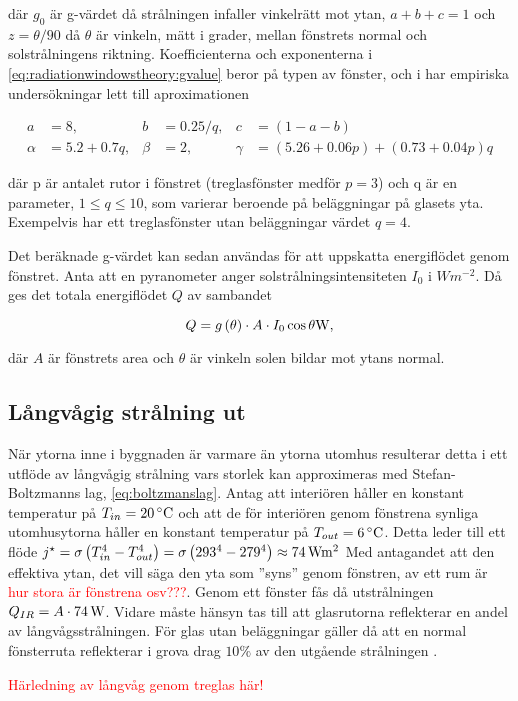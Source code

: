där $g_0$ är g-värdet då strålningen infaller vinkelrätt mot ytan, $a+b+c=1$ och $z=\theta/90$ då $\theta$ är vinkeln, mätt i grader, mellan fönstrets normal och solstrålningens riktning. Koefficienterna och exponenterna i \eqref{eq:radiationwindowstheory:gvalue} beror på typen av fönster, och i \cite{karlssonroos99} har empiriska undersökningar lett till aproximationen

\begin{align}\label{eq:gconstants}
a & = 8, & b & = 0.25/q, & c & = (1-a-b) \nonumber \\
\alpha & = 5.2 + 0.7q, & \beta & = 2, & \gamma & = (5.26+0.06p) + (0.73+0.04p)q
\end{align}

där p är antalet rutor i fönstret (treglasfönster medför $p = 3$) och q är en parameter, $1 \le q \le 10$, som varierar beroende på beläggningar på glasets yta. Exempelvis har ett treglasfönster utan beläggningar värdet $q=4$.

Det beräknade g-värdet kan sedan användas för att uppskatta energiflödet genom fönstret. Anta att en pyranometer anger solstrålningsintensiteten $I_0$ i $\unit{W m^{-2}}$. Då ges det totala energiflödet $Q$ av sambandet 

\begin{equation}\label{eq:totalsun}
Q = g \left( \theta \right)\cdot A \cdot I_0 \cos{\theta} \unit[]{W},
\end{equation}

där $A$ är fönstrets area och $\theta$ är vinkeln solen bildar mot ytans normal.

\subsection{Långvågig strålning ut}

När ytorna inne i byggnaden är varmare än ytorna utomhus resulterar detta i ett utflöde av långvågig strålning vars storlek kan approximeras med Stefan-Boltzmanns lag, \ref{eq:boltzmanslag}. Antag att interiören håller en konstant temperatur på $T_{in} = \unit[20]{^{\circ}C}$ och att de för interiören genom fönstrena synliga utomhusytorna håller en konstant temperatur på $T_{out} = \unit[6]{^{\circ}C}$. Detta leder till ett flöde $j^{\star} = \sigma \left( T_{in}^{4}-T_{out}^4\right) = \sigma \left( 293^4-279^4 \right) \approx \unit[74]{Wm^{2}}$ Med antagandet att den effektiva ytan, det vill säga den yta som ''syns'' genom fönstren, av ett rum är \textcolor{red}{hur stora är fönstrena osv???}. Genom ett fönster fås då utstrålningen $Q_{IR}=A\cdot\unit[74]{W}$. Vidare måste hänsyn tas till att glasrutorna reflekterar en andel av långvågsstrålningen. För glas utan beläggningar gäller då att en normal fönsterruta reflekterar i grova drag $10\%$ av den utgående strålningen \cite{gelin05}.

\textcolor{red}{Härledning av långvåg genom treglas här!}

